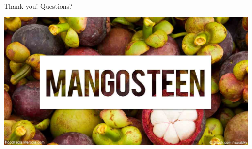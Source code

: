 \documentclass[usenames,dvipsnames]{beamer}
\begin{document}
\begin{frame}{ $  $ }

{\Huge Thank you! Questions?}
\begin{center}
	\includegraphics[width=.7\textwidth]{figures/mangosteen}
\end{center}
\end{frame}



\end{document}
